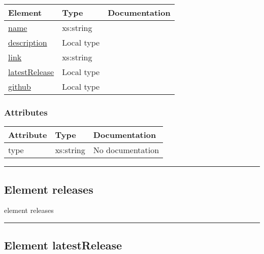 \documentclass[
]{article}
\begin{document}
\begin{longtable}[]{@{}lll@{}}
\toprule
Element & Type & Documentation \\
\midrule
\endhead
\protect\hyperlink{element_name}{name} & xs:string & \\
\protect\hyperlink{element_description}{description} & Local type & \\
\protect\hyperlink{element_link}{link} & xs:string & \\
\protect\hyperlink{element_latestRelease}{latestRelease} & Local type
& \\
\protect\hyperlink{element_github}{github} & Local type & \\
\bottomrule
\end{longtable}

\hypertarget{attributes-2}{%
\subsubsection{Attributes}\label{attributes-2}}

\begin{longtable}[]{@{}lll@{}}
\toprule
Attribute & Type & Documentation \\
\midrule
\endhead
type & xs:string & No documentation \\
\bottomrule
\end{longtable}

\begin{center}\rule{0.5\linewidth}{0.5pt}\end{center}

\protect\hypertarget{element_releases}{}{}

\hypertarget{element-releases}{%
\subsection{\texorpdfstring{Element { releases
}}{Element  releases }}\label{element-releases}}

{element releases}

\begin{center}\rule{0.5\linewidth}{0.5pt}\end{center}

\protect\hypertarget{element_latestRelease}{}{}

\hypertarget{element-latestrelease}{%
\subsection{\texorpdfstring{Element { latestRelease
}}{Element  latestRelease }}\label{element-latestrelease}}
\end{document}

